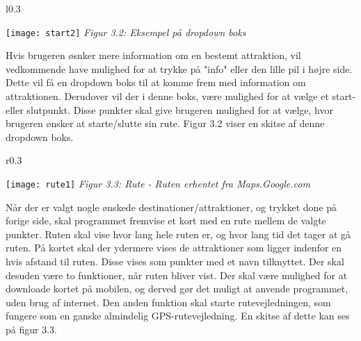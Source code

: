\begin{wrapfigure}{l}{0.3\textwidth}
	\vspace{-50pt}
	\begin{center}
		\texttt{[image: start2]} \newline
		\textit{Figur 3.2: \newline Eksempel på dropdown boks}\newline
	\end{center}
	\vspace{20pt}
\end{wrapfigure}

Hvis brugeren øsnker mere information om en bestemt attraktion, vil vedkommende have mulighed for at trykke på "info" eller den lille pil i højre side. Dette vil få en dropdown boks til at komme frem med information om attraktionen. Derudover vil der i denne boks, være mulighed for at vælge et start- eller slutpunkt. Disse punkter skal give brugeren mulighed for at vælge, hvor brugeren ønsker at starte/slutte sin rute. Figur 3.2 viser en skitse af denne dropdown boks.\newline
\newline
\newline
\newline
\newline

\begin{wrapfigure}{r}{0.3\textwidth}
	\vspace{-30pt}
	\begin{center}
		\texttt{[image: rute1]} \newline
		\textit{Figur 3.3: Rute - Ruten er\newline hentet fra Maps.Google.com}\newline
	\end{center}
	\vspace{0pt}
	\vspace{-100pt}
\end{wrapfigure}


Når der er valgt nogle ønskede destinationer/attraktioner, og trykket done på forige side, skal programmet fremvise et kort med en rute mellem de valgte punkter. Ruten skal vise hvor lang hele ruten er, og hvor lang tid det tager at gå ruten. På kortet skal der ydermere vises de attraktioner som ligger indenfor en hvis afstand til ruten. Disse vises som punkter med et navn tilknyttet.
Der skal desuden være to funktioner, når ruten bliver vist. Der skal være mulighed for at downloade kortet på mobilen, og derved gør det muligt at anvende programmet, uden brug af internet. Den anden funktion skal starte rutevejledningen, som fungere som en ganske almindelig GPS-rutevejledning. En skitse af dette kan ses på figur 3.3.\newline
\newline
\newline
\newline
\newline
\newline
\newline
\newline

